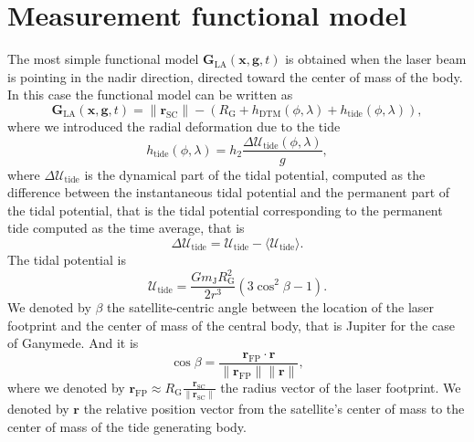 \documentclass[pdflatex,sn-mathphys-num]{sn-jnl}%
\theoremstyle{thmstyleone}%
\theoremstyle{thmstyletwo}%
\theoremstyle{thmstylethree}%
\renewcommand{\vec}[1]{\boldsymbol{#1}}
\begin{document}
\section{Measurement functional model}
The most simple functional model $ \vec{G}_{\mathrm{LA}}( \vec{x},\vec{g},t)$ is obtained when the laser beam is pointing in the nadir direction, directed toward the center of mass of the body. In this case the functional model can be written as 
%
\begin{equation} \label{eq:g_LA_nadir}
\vec{G}_{\mathrm{LA}}(\vec{x},\vec{g},t) = \|\vec{r}_{\mathrm{SC}} \| - \left(R_{\mathrm{G}} 
+ h_{\mathrm{DTM}}(\phi, \lambda) 
+ h_{\mathrm{tide}}(\phi, \lambda) 
\right),
\end{equation}
%
where we introduced the radial deformation due to the tide 
\begin{equation}
h_{\mathrm{tide}}(\phi, \lambda) = 
h_2 \frac{\Delta \mathcal{U}_{\mathrm{tide}}(\phi, \lambda)}{g},
\end{equation}
where $\Delta \mathcal{U}_{\mathrm{tide}}$ is the dynamical part of the tidal potential, computed as the difference between the instantaneous tidal potential and the permanent part of the tidal potential, that is the tidal potential corresponding to the permanent tide computed as the time average, that is 
\begin{equation}
	\Delta \mathcal{U}_{\mathrm{tide}} = \mathcal{U}_{\mathrm{tide}} - \langle\mathcal{U}_{\mathrm{tide}}\rangle.
\end{equation}
%
The tidal potential is %
\begin{equation} %
	\mathcal{U}_{\mathrm{tide}} =  \frac{G m_{\mathrm{J}} R_{\mathrm{G}}^2}{2 r^3} \left( 3\cos^2\beta -1 \right).
\end{equation}
%
We denoted by $\beta$ the satellite-centric angle between the location of the laser footprint and the center of mass of the central body, that is Jupiter for the case of Ganymede. And it is
\begin{equation}
	\label{eq:beta_angle}
	\cos \beta = \frac{\vec{r}_{\mathrm{FP}}\cdot \vec{r}}{\|\vec{r}_{\mathrm{FP}}\| \| \vec{r} \|},
\end{equation}
%
where we denoted by 
${\vec{r}_{\mathrm{FP}} \approx R_\mathrm{G} \frac{\vec{r}_{\mathrm{SC}}}{\| \vec{r}_{\mathrm{SC}}\|} }$ the radius vector of the laser footprint.
We denoted by $\vec{r}$ the relative position vector from the satellite's center of mass to the center of mass of the tide generating body.
\end{document}
